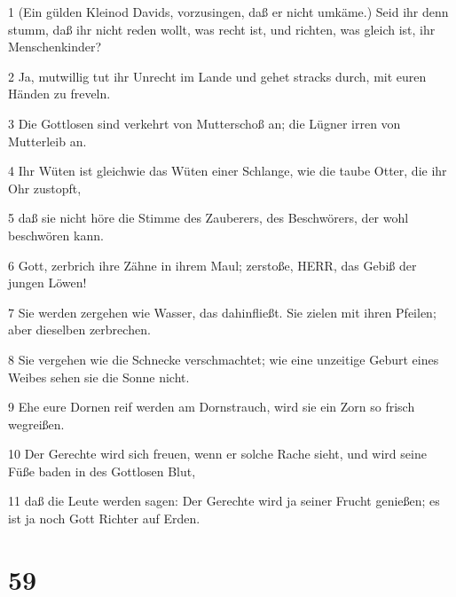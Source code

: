 \par 1 (Ein gülden Kleinod Davids, vorzusingen, daß er nicht umkäme.) Seid ihr denn stumm, daß ihr nicht reden wollt, was recht ist, und richten, was gleich ist, ihr Menschenkinder?
\par 2 Ja, mutwillig tut ihr Unrecht im Lande und gehet stracks durch, mit euren Händen zu freveln.
\par 3 Die Gottlosen sind verkehrt von Mutterschoß an; die Lügner irren von Mutterleib an.
\par 4 Ihr Wüten ist gleichwie das Wüten einer Schlange, wie die taube Otter, die ihr Ohr zustopft,
\par 5 daß sie nicht höre die Stimme des Zauberers, des Beschwörers, der wohl beschwören kann.
\par 6 Gott, zerbrich ihre Zähne in ihrem Maul; zerstoße, HERR, das Gebiß der jungen Löwen!
\par 7 Sie werden zergehen wie Wasser, das dahinfließt. Sie zielen mit ihren Pfeilen; aber dieselben zerbrechen.
\par 8 Sie vergehen wie die Schnecke verschmachtet; wie eine unzeitige Geburt eines Weibes sehen sie die Sonne nicht.
\par 9 Ehe eure Dornen reif werden am Dornstrauch, wird sie ein Zorn so frisch wegreißen.
\par 10 Der Gerechte wird sich freuen, wenn er solche Rache sieht, und wird seine Füße baden in des Gottlosen Blut,
\par 11 daß die Leute werden sagen: Der Gerechte wird ja seiner Frucht genießen; es ist ja noch Gott Richter auf Erden.

\chapter{59}

